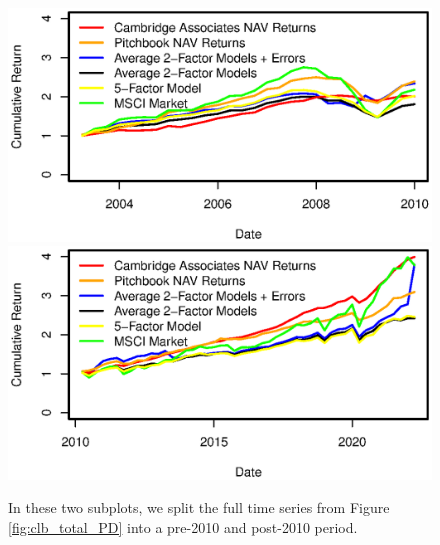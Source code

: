 \begin{figure}[H]
	\centering
	\includegraphics{Figures/XTotalErrorSeriesPDpre2010}
	\includegraphics{Figures/XTotalErrorSeriesPDpost2010}
	\caption{
		In these two subplots, we split the full time series from Figure \ref{fig:clb_total_PD} into a pre-2010 and post-2010 period.
	}
	\label{fig:clb_pre_post_2010_PD}
\end{figure}
